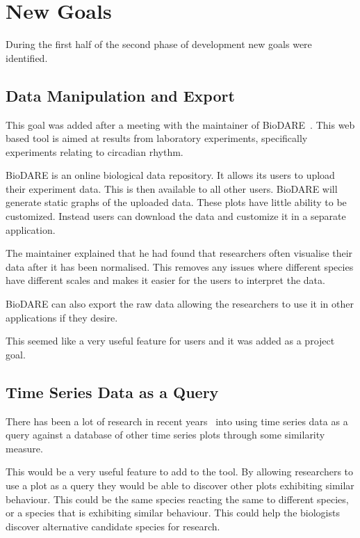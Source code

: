 \section{New Goals}
During the first half of the second phase of development new goals were identified.

\subsection{Data Manipulation and Export}

This goal was added after a meeting with the maintainer of BioDARE~\cite{biodare}.  This web based tool is aimed at results from laboratory experiments, specifically experiments relating to circadian rhythm.

BioDARE is an online biological data repository.  It allows its users to upload their experiment data.  This is then available to all other users.  BioDARE will generate static graphs of the uploaded data.  These plots have little ability to be customized.  Instead users can download the data and customize it in a separate application.

The maintainer explained that he had found that researchers often visualise their data after it has been normalised.  This removes any issues where different species have different scales and makes it easier for the users to interpret the data.

BioDARE can also export the raw data allowing the researchers to use it in other applications if they desire.

This seemed like a very useful feature for users and it was added as a project goal.

\subsection{Time Series Data as a Query}

There has been a lot of research in recent years~\cite{esling, chotirat, agrawal, nakamura, goldin, structural_similarity, faloutsos, chakrabarti, popivanov, keogh, faloutsos2, bollobas, kahveci} into using time series data as a query against a database of other time series plots through some similarity measure.

This would be a very useful feature to add to the tool.  By allowing researchers to use a plot as a query they would be able to discover other plots exhibiting similar behaviour.  This could be the same species reacting the same to different species, or a species that is exhibiting similar behaviour.  This could help the biologists discover alternative candidate species for research.

